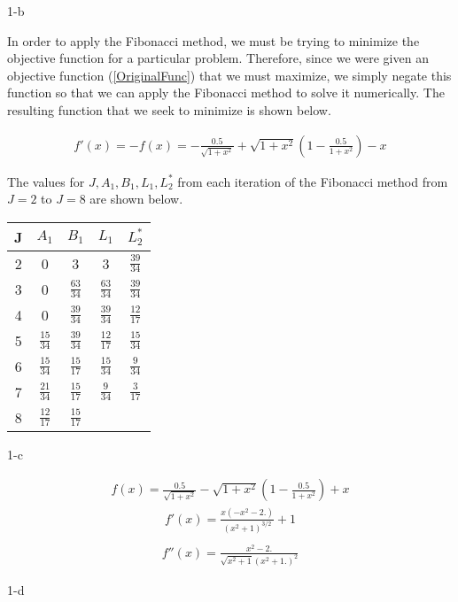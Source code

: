 \documentclass[11pt]{article}
\begin{document}
\begin{prob}{1-b}
\end{prob}
\begin{sol} 

In order to apply the Fibonacci method, we must be trying to minimize the objective function for a particular problem. Therefore, since we were given an objective function (\ref{OriginalFunc}) that we must maximize, we simply negate this function so that we can apply the Fibonacci method to solve it numerically. The resulting function that we seek to minimize is shown below.

\begin{eqnarray*}
f'(x) = -f(x) =-\frac{0.5}{\sqrt{1+x^2}}+\sqrt{1+x^2} \left(1-\frac{0.5}{1+x^2}\right)-x 
\end{eqnarray*}

The values for $J, A_{1}, B_{1}, L_{1}, L_{2}^*$ from each iteration of the Fibonacci method from $J=2$ to $J=8$ are shown below.

\begin{center}
  \begin{tabular}{| c | c | c | c | c |}
    \hline
	J & $A_{1}$ & $B_{1}$ & \textbf{$L_{1}$} & \textbf{$L_{2}^{*}$} \\ \hline
	2 & 0 & 3 & 3 & $\frac{39}{34}$ \\ \hline
	3 & 0 & $\frac{63}{34}$ & $\frac{63}{34}$ & $\frac{39}{34}$ \\ \hline
	4 & 0 & $\frac{39}{34}$ & $\frac{39}{34}$ & $\frac{12}{17}$ \\ \hline
	5 & $\frac{15}{34}$ & $\frac{39}{34}$ & $\frac{12}{17}$ & $\frac{15}{34}$ \\ \hline
	6 & $\frac{15}{34}$ & $\frac{15}{17}$ & $\frac{15}{34}$ & $\frac{9}{34}$ \\ \hline
	7 & $\frac{21}{34}$ & $\frac{15}{17}$ & $\frac{9}{34}$ & $\frac{3}{17}$ \\ \hline
	8 & $\frac{12}{17}$ & $\frac{15}{17}$ 
  \end{tabular}
\end{center}

\end{sol}

\begin{prob}{1-c}
\end{prob}
\begin{sol} 

\begin{eqnarray*}
f(x)=\frac{0.5}{\sqrt{1+x^2}}-\sqrt{1+x^2} \left(1-\frac{0.5}{1+x^2}\right)+x 
\end{eqnarray*}
\begin{eqnarray*}
f'(x)=\frac{x \left(-x^2-2.\right)}{\left(x^2+1\right)^{3/2}}+1 \\
\end{eqnarray*}
\begin{eqnarray*}
f''(x)=\frac{x^2-2.}{\sqrt{x^2+1} \left(x^2+1.\right)^2}
\end{eqnarray*}

\end{sol}

\begin{prob}{1-d}
\end{prob}
\begin{sol} 



\end{sol}
\end{document}
